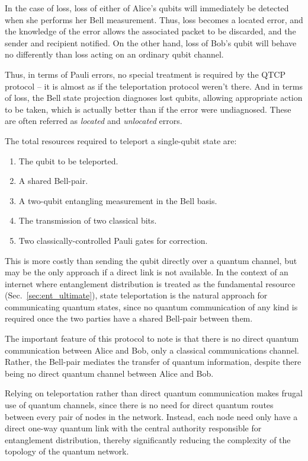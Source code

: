 In the case of loss, loss of either of Alice's qubits will immediately be detected when she performs her Bell measurement. Thus, loss becomes a located error, and the knowledge of the error allows the associated packet to be discarded, and the sender and recipient notified. On the other hand, loss of Bob's qubit will behave no differently than loss acting on an ordinary qubit channel.

Thus, in terms of Pauli errors, no special treatment is required by the QTCP protocol -- it is almost as if the teleportation protocol weren't there. And in terms of loss, the Bell state projection diagnoses lost qubits, allowing appropriate action to be taken, which is actually better than if the error were undiagnosed. These are often referred as \textit{located} and \textit{unlocated} errors.

The total resources required to teleport a single-qubit state are:
\begin{enumerate}
\item The qubit to be teleported.
\item A shared Bell-pair.
\item A two-qubit entangling measurement in the Bell basis.
\item The transmission of two classical bits.
\item Two classically-controlled Pauli gates for correction.
\end{enumerate}

This is more costly than sending the qubit directly over a quantum channel, but may be the only approach if a direct link is not available. In the context of an internet where entanglement distribution is treated as the fundamental resource (Sec.~\ref{sec:ent_ultimate}), state teleportation is the natural approach for communicating quantum states, since no quantum communication of any kind is required once the two parties have a shared Bell-pair between them.

The important feature of this protocol to note is that there is no direct quantum communication between Alice and Bob, only a classical communications channel. Rather, the Bell-pair mediates the transfer of quantum information, despite there being no direct quantum channel between Alice and Bob.

Relying on teleportation rather than direct quantum communication makes frugal use of quantum channels, since there is no need for direct quantum routes between every pair of nodes in the network. Instead, each node need only have a direct one-way quantum link with the central authority responsible for entanglement distribution, thereby significantly reducing the complexity of the topology of the quantum network.


